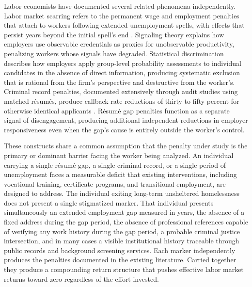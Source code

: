 \documentclass[12pt, letterpaper]{article}
\begin{document}
Labor economists have documented several related phenomena independently. Labor market scarring refers to the permanent wage and employment penalties that attach to workers following extended unemployment spells, with effects that persist years beyond the initial spell's end \citep{arulampalam2001unemployment}. Signaling theory \citep{spence1973job} explains how employers use observable credentials as proxies for unobservable productivity, penalizing workers whose signals have degraded. Statistical discrimination \citep{arrow1973higher,phelps1972statistical} describes how employers apply group-level probability assessments to individual candidates in the absence of direct information, producing systematic exclusion that is rational from the firm's perspective and destructive from the worker's. Criminal record penalties, documented extensively through audit studies using matched r\'{e}sum\'{e}s, produce callback rate reductions of thirty to fifty percent for otherwise identical applicants \citep{pager2003mark}. R\'{e}sum\'{e} gap penalties function as a separate signal of disengagement, producing additional independent reductions in employer responsiveness even when the gap's cause is entirely outside the worker's control.

These constructs share a common assumption that the penalty under study is the primary or dominant barrier facing the worker being analyzed. An individual carrying a single r\'{e}sum\'{e} gap, a single criminal record, or a single period of unemployment faces a measurable deficit that existing interventions, including vocational training, certificate programs, and transitional employment, are designed to address. The individual exiting long-term unsheltered homelessness does not present a single stigmatized marker. That individual presents simultaneously an extended employment gap measured in years, the absence of a fixed address during the gap period, the absence of professional references capable of verifying any work history during the gap period, a probable criminal justice intersection, and in many cases a visible institutional history traceable through public records and background screening services. Each marker independently produces the penalties documented in the existing literature. Carried together they produce a compounding return structure that pushes effective labor market returns toward zero regardless of the effort invested.
\end{document}
